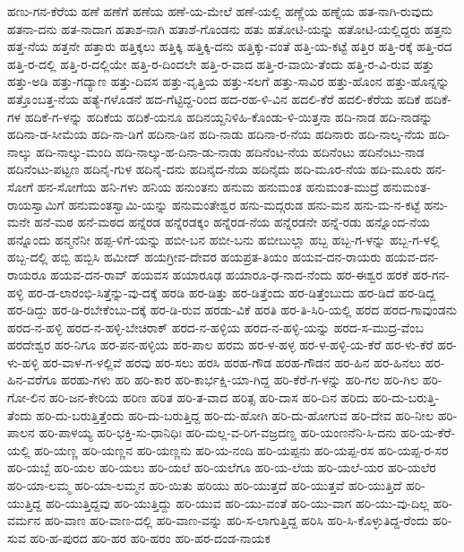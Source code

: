 ಹಣು-ಗನ-ಕೆರೆಯ
ಹಣೆ
ಹಣೆಗೆ
ಹಣೆಯ
ಹಣೆ-ಯ-ಮೇಲೆ
ಹಣೆ-ಯಲ್ಲಿ
ಹಣ್ಣೆಯ
ಹಣ್ನೆಯ
ಹತ-ನಾಗಿ-ರುವುದು
ಹತನಾ-ದನು
ಹತ-ನಾದಾಗ
ಹತಾಶ-ನಾಗಿ
ಹತಾಶೆ-ಗೊಂಡನು
ಹತು
ಹತೋಟಿ-ಯನ್ನು
ಹತೋಟಿ-ಯಲ್ಲಿದ್ದರು
ಹತ್ತನು
ಹತ್ತ-ನೆಯ
ಹತ್ತನೇ
ಹತ್ತಾರು
ಹತ್ತಿಕ್ಕಲು
ಹತ್ತಿಕ್ಕಿ
ಹತ್ತಿಕ್ಕಿ-ದನು
ಹತ್ತಿಕ್ಕು-ವಂತೆ
ಹತ್ತಿ-ಯ-ಕಟ್ಟೆ
ಹತ್ತಿರ
ಹತ್ತಿ-ರಕ್ಕೆ
ಹತ್ತಿ-ರದ
ಹತ್ತಿ-ರ-ದಲ್ಲಿ
ಹತ್ತಿ-ರ-ದಲ್ಲಿಯೇ
ಹತ್ತಿ-ರ-ದಿಂದಲೇ
ಹತ್ತಿ-ರ-ವಾದ
ಹತ್ತಿ-ರ-ವಾಯಿ-ತೆಂದು
ಹತ್ತಿ-ರ-ವಿ-ರುವ
ಹತ್ತು
ಹತ್ತು-ಅಡಿ
ಹತ್ತು-ಗದ್ಯಾಣ
ಹತ್ತು-ದಿವಸ
ಹತ್ತು-ವೃತ್ತಿಯ
ಹತ್ತು-ಸಲಗೆ
ಹತ್ತು-ಸಾವಿರ
ಹತ್ತು-ಹೊಂನ
ಹತ್ತು-ಹೊನ್ನನ್ನು
ಹತ್ತೊಂಬತ್ತ-ನೆಯ
ಹತ್ಯೆ-ಗಳೊಡನೆ
ಹದ-ಗೆಟ್ಟಿದ್ದ-ರಿಂದ
ಹದ-ರಹ-ಳಿ-ವಿನ
ಹದಲಿ-ಕೆರೆ
ಹದಲಿ-ಕೆರೆಯ
ಹದಿಕೆ
ಹದಿಕೆ-ಗಳ
ಹದಿಕೆ-ಗ-ಳನ್ನು
ಹದಿಕೆಯ
ಹದಿಕೆ-ಯನೂ
ಹದಿನಯ್ದನಿಳಿಹಿ-ಕೊಂಡು-ಳಿ-ಯಿತ್ತನಾ
ಹದಿ-ನಾಡ
ಹದಿ-ನಾಡನ್ನು
ಹದಿನಾ-ಡ-ಸೀಮೆಯ
ಹದಿ-ನಾ-ಡಿಗೆ
ಹದಿನಾ-ಡಿನ
ಹದಿ-ನಾಡು
ಹದಿನಾ-ರ-ನೆಯ
ಹದಿನಾರು
ಹದಿ-ನಾಲ್ಕ-ನೆಯ
ಹದಿ-ನಾಲ್ಕು
ಹದಿ-ನಾಲ್ಕು-ಮಂದಿ
ಹದಿ-ನಾಲ್ಕು-ಹ-ದಿನಾ-ಡು-ನಾಡು
ಹದಿನೆಂಟ-ನೆಯ
ಹದಿನೆಂಟು
ಹದಿನೆಂಟು-ನಾಡ
ಹದಿನೆಂಟು-ಪಟ್ಟಣ
ಹದಿನೈ-ಗುಳ
ಹದಿನೈ-ದನು
ಹದಿನೈದ-ನೆಯ
ಹದಿನೈದು
ಹದಿ-ಮೂರ-ನೆಯ
ಹದಿ-ಮೂರು
ಹನ-ಸೋಗೆ
ಹನ-ಸೋಗೆಯ
ಹನಿ-ಗಳು
ಹನಿಯ
ಹನುಂತನು
ಹನುಮ
ಹನುಮಂತ
ಹನುಮಂತ-ಮುದ್ರೆ
ಹನುಮಂತ-ರಾಯಸ್ವಾಮಿಗೆ
ಹನುಮಂತಸ್ವಾಮಿ-ಯನ್ನು
ಹನುಮಂತೇಶ್ವರ
ಹನು-ಮದ್ಗರುಡ
ಹನು-ಮನ
ಹನು-ಮ-ನ-ಕಟ್ಟೆ
ಹನು-ಮನೇ
ಹನೆ-ಮಠ
ಹನೆ-ಮಠದ
ಹನ್ನೆರಡ
ಹನ್ನೆರಡಕ್ಕಂ
ಹನ್ನೆರಡ-ನೆಯ
ಹನ್ನೆರಡನೇ
ಹನ್ನೆ-ರಡು
ಹನ್ನೊಂದ-ನೆಯ
ಹನ್ನೊಂದು
ಹನ್ಮನೆನೀ
ಹಪ್ಪ-ಳಿಗೆ-ಯನ್ನು
ಹಬೀ-ಬನ
ಹಬೀ-ಬನು
ಹಬೀಬುಲ್ಲಾ
ಹಬ್ಬ
ಹಬ್ಬ-ಗ-ಳನ್ನು
ಹಬ್ಬ-ಗ-ಳಲ್ಲಿ
ಹಬ್ಬ-ದಲ್ಲಿ
ಹಬ್ಬಿ
ಹಬ್ಬಿಸಿ
ಹಮೀದ್
ಹಯಗ್ರೀವ-ದೇವರ
ಹಯಪ್ರತ-ತಿಯಂ
ಹಯವ-ದನ-ರಾಯರು
ಹಯವ-ದನ-ರಾಯರೂ
ಹಯವ-ದನ-ರಾವ್
ಹಯವಸ
ಹಯಾರೂಢ
ಹಯಾರೂ-ಢ-ನಾದ-ನೆಂದು
ಹರ-ಈಶ್ವರ
ಹರಕೆ
ಹರ-ಗನ-ಹಳ್ಳಿ
ಹರ-ಡ-ಲಾರಂಭಿ-ಸಿತ್ತೆನ್ನು-ವು-ದಕ್ಕೆ
ಹರಡಿ
ಹರ-ಡಿತ್ತು
ಹರ-ಡಿತ್ತೆಂದು
ಹರ-ಡಿತ್ತೆಂಬುದು
ಹರ-ಡಿದೆ
ಹರ-ಡಿದ್ದ
ಹರ-ಡಿದ್ದು
ಹರ-ಡಿ-ರಬೇಕೆಂಬು-ದಕ್ಕೆ
ಹರ-ಡಿ-ರುವ
ಹರಡು-ವಿಕೆ
ಹರತಿ
ಹರ-ತಿ-ಸಿರಿ-ಯಲ್ಲಿ
ಹರದ
ಹರದ-ಗಾವುಂಡನು
ಹರದ-ನ-ಹಳ್ಳಿ
ಹರದ-ನ-ಹಳ್ಳಿ-ಬೇಚಿರಾಕ್
ಹರದ-ನ-ಹಳ್ಳಿಯ
ಹರದ-ನ-ಹಳ್ಳಿ-ಯನ್ನು
ಹರದ-ಸ-ಮುದ್ರ-ವೆಂಬ
ಹರದೇಶ್ವರ
ಹರ-ನಿಗೂ
ಹರ-ಪನ-ಹಳ್ಳಿಯ
ಹರ-ಪಾಲ
ಹರಮ
ಹರ-ಳ-ಹಳ್ಳ
ಹರ-ಳ-ಹಳ್ಳಿ-ಯ-ಕೆರೆ
ಹರ-ಳು-ಕೆರೆ
ಹರ-ಳು-ಹಳ್ಳಿ
ಹರ-ವಾಳ-ಗ-ಳಲ್ಲಿವೆ
ಹರವು
ಹರ-ಸಲು
ಹರಸಿ
ಹರಹ-ಗೌಡ
ಹರಹ-ಗೌಡನ
ಹರ-ಹಿನ
ಹರ-ಹಿನಲು
ಹರ-ಹಿನ-ವರೆಗೂ
ಹರಹು-ಗಳು
ಹರಿ
ಹರಿ-ಕಾರ
ಹರಿ-ಕಾರ್ಭಕ್ಷಿ-ಯಾ-ಗಿದ್ದ
ಹರಿ-ಕೆರೆ-ಗ-ಳನ್ನು
ಹರಿ-ಗಲ
ಹರಿ-ಗಿಲ
ಹರಿ-ಗೋ-ಲಿನ
ಹರಿ-ಜನ-ಕೇರಿಯ
ಹರಿಣ
ಹರಿತ
ಹರಿ-ತ-ವಾದ
ಹರಿತ್ಸ
ಹರಿ-ದಾಸ
ಹರಿ-ದಿನ
ಹರಿದು
ಹರಿ-ದು-ಬರುತ್ತಿ-ತೆಂದು
ಹರಿ-ದು-ಬರುತ್ತಿತ್ತೆಂದು
ಹರಿ-ದು-ಬರುತ್ತಿದ್ದ
ಹರಿ-ದು-ಹೋಗಿ
ಹರಿ-ದು-ಹೋಗುವ
ಹರಿ-ದೇವ
ಹರಿ-ನೀಲ
ಹರಿ-ಪಾಲನ
ಹರಿ-ಪಾಳಯ್ಯ
ಹರಿ-ಭಕ್ತಿ-ಸು-ಧಾನಿಧಿಃ
ಹರಿ-ಮಲ್ಲ-ವ-ರಿಗ-ವಜ್ರದಣ್ಡ
ಹರಿ-ಯಂಣನೆನಿ-ಸಿ-ದನು
ಹರಿ-ಯ-ಕೆರೆ-ಯಲ್ಲಿ
ಹರಿ-ಯಣ್ಣ
ಹರಿ-ಯಣ್ಣನ
ಹರಿ-ಯಣ್ಣನು
ಹರಿ-ಯ-ನಂದಿ
ಹರಿ-ಯಪ್ಪನು
ಹರಿ-ಯಪ್ಪ-ರಸ
ಹರಿ-ಯಪ್ಪ-ರ-ಸರ
ಹರಿ-ಯಬ್ಬೆ
ಹರಿ-ಯಲ
ಹರಿ-ಯಲು
ಹರಿ-ಯಲೆ
ಹರಿ-ಯಲೆಗೂ
ಹರಿ-ಯ-ಲೆಯ
ಹರಿ-ಯಲೆ-ಯರ
ಹರಿ-ಯಲೆರ
ಹರಿ-ಯಾ-ಲಮ್ಮ
ಹರಿ-ಯಾ-ಲಮ್ಮನ
ಹರಿ-ಯಿತು
ಹರಿಯು
ಹರಿ-ಯುತ್ತದೆ
ಹರಿ-ಯುತ್ತವೆ
ಹರಿ-ಯುತ್ತಿದೆ
ಹರಿ-ಯುತ್ತಿದ್ದ
ಹರಿ-ಯುತ್ತಿದ್ದವು
ಹರಿ-ಯುತ್ತಿದ್ದು
ಹರಿ-ಯುವ
ಹರಿ-ಯು-ವಂತೆ
ಹರಿ-ಯು-ವಾಗ
ಹರಿ-ಯು-ವು-ದಿಲ್ಲ
ಹರಿ-ವರ್ಮನ
ಹರಿ-ವಾಣ
ಹರಿ-ವಾಣ-ದಲ್ಲಿ
ಹರಿ-ವಾಣ-ವನ್ನು
ಹರಿ-ಸ-ಲಾಗುತ್ತಿದ್ದ
ಹರಿಸಿ
ಹರಿ-ಸಿ-ಕೊಳ್ಳುತಿದ್ದ-ರೆಂದು
ಹರಿ-ಸುವ
ಹರಿ-ಹ-ಪುರದ
ಹರಿ-ಹರ
ಹರಿ-ಹರಂ
ಹರಿ-ಹರ-ದಂಡ-ನಾಯಕ
